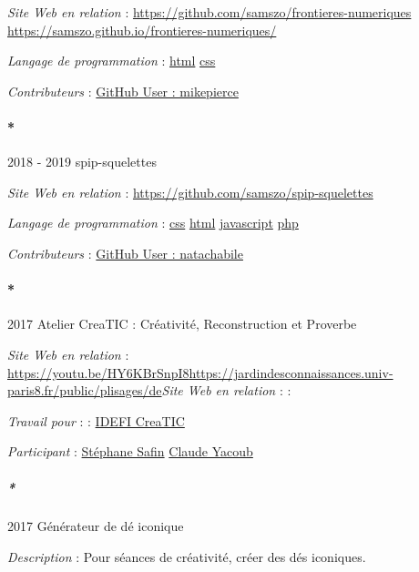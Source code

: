 \documentclass[
  a4paper,
  DIV=11,
  numbers=noendperiod]{scrreprt}
\let\oldparagraph\paragraph
\renewcommand{\paragraph}[1]{\oldparagraph{#1}\mbox{}}
\let\oldsubparagraph\subparagraph
\renewcommand{\subparagraph}[1]{\oldsubparagraph{#1}\mbox{}}
\begin{document}
\emph{Site Web en relation} :
\url{https://github.com/samszo/frontieres-numeriques}
\url{https://samszo.github.io/frontieres-numeriques/}

\emph{Langage de programmation} :
\href{http://localhost/samszo/omk/s/fiches/item/96621}{html}
\href{http://localhost/samszo/omk/s/fiches/item/102418}{css}

\emph{Contributeurs} :
\href{http://localhost/samszo/omk/s/fiches/item/301045}{GitHub User :
mikepierce}

\paragraph*{2018 - 2019 spip-squelettes}\label{sec-item301818}

\emph{Site Web en relation} :
\url{https://github.com/samszo/spip-squelettes}

\emph{Langage de programmation} :
\href{http://localhost/samszo/omk/s/fiches/item/102418}{css}
\href{http://localhost/samszo/omk/s/fiches/item/96621}{html}
\href{http://localhost/samszo/omk/s/fiches/item/89711}{javascript}
\href{http://localhost/samszo/omk/s/fiches/item/108369}{php}

\emph{Contributeurs} :
\href{http://localhost/samszo/omk/s/fiches/item/300873}{GitHub User :
natachabile}

\paragraph*{2017 Atelier CreaTIC : Créativité, Reconstruction et
Proverbe}\label{sec-item299727}

\emph{Site Web en relation} :
\url{https://youtu.be/HY6KBrSnpI8}\url{https://jardindesconnaissances.univ-paris8.fr/public/plisages/de}\emph{Site
Web en relation} : :

\emph{Travail pour} : :
\href{http://localhost/samszo/omk/s/fiches/item/299593}{IDEFI CreaTIC}

\emph{Participant} :
\href{http://localhost/samszo/omk/s/fiches/item/62190}{Stéphane Safin}
\href{http://localhost/samszo/omk/s/fiches/item/61424}{Claude Yacoub}

\subparagraph*{2017 Générateur de dé iconique}\label{sec-item299726}

\emph{Description} : Pour séances de créativité, créer des dés
iconiques.
\end{document}
